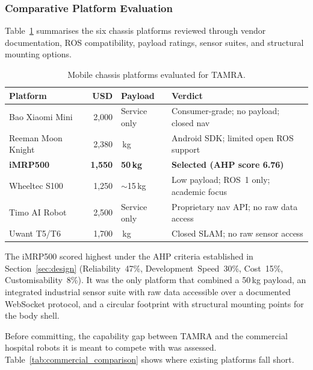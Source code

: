 \documentclass[11pt,a4paper]{article}
\begin{document}
\subsubsection{Comparative Platform Evaluation}

Table~\ref{tab:platform_eval} summarises the six chassis platforms reviewed through vendor documentation, ROS compatibility, payload ratings, sensor suites, and structural mounting options.

\begin{table}[H]
\centering
\small
\caption{Mobile chassis platforms evaluated for TAMRA.}
\label{tab:platform_eval}
\setlength{\tabcolsep}{4pt}
\begin{tabular}{@{} >{\raggedright\arraybackslash}p{2.8cm} r >{\raggedright\arraybackslash}p{1.5cm} >{\raggedright\arraybackslash}p{3.4cm} @{}}
\toprule
\textbf{Platform} & \textbf{USD} & \textbf{Payload} & \textbf{Verdict} \\
\midrule
Bao Xiaomi Mini    & 2{,}000 & Service only & Consumer-grade; no payload; closed nav \\
Reeman Moon Knight & 2{,}380 & 60\,kg       & Android SDK; limited open ROS support \\
\textbf{iMRP500}   & \textbf{1{,}550} & \textbf{50\,kg} & \textbf{Selected (AHP score 6.76)} \\
Wheeltec S100      & 1{,}250 & $\sim$15\,kg & Low payload; ROS~1 only; academic focus \\
Timo AI Robot      & 2{,}500 & Service only & Proprietary nav API; no raw data access \\
Uwant T5/T6        & 1{,}700 & 40\,kg       & Closed SLAM; no raw sensor access \\
\bottomrule
\end{tabular}
\end{table}

\noindent The iMRP500 scored highest under the AHP criteria established in Section~\ref{sec:design} (Reliability~47\%, Development~Speed~30\%, Cost~15\%, Customisability~8\%). It was the only platform that combined a 50\,kg payload, an integrated industrial sensor suite with raw data accessible over a documented WebSocket protocol, and a circular footprint with structural mounting points for the body shell.

Before committing, the capability gap between TAMRA and the commercial hospital robots it is meant to compete with was assessed. Table~\ref{tab:commercial_comparison} shows where existing platforms fall short.
\end{document}
